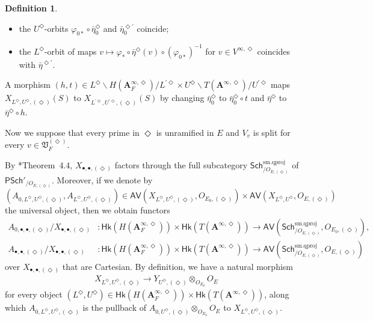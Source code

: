 \documentclass[12pt]{amsart}
\numberwithin{equation}{section}
\theoremstyle{plain}
\theoremstyle{definition}
\newtheorem{definition}[proposition]{Definition}
\theoremstyle{remark}
\renewcommand{\b}[1]{\mathbf{#1}}
\newcommand{\f}[1]{\mathfrak{#1}}
\renewcommand{\r}[1]{\mathrm{#1}}
\renewcommand{\sf}[1]{\mathsf{#1}}
\renewcommand{\(}{\left(}
\renewcommand{\)}{\right)}
\newcommand{\bA}{\b A}
\newcommand{\fV}{\f V}
\newcommand{\sfP}{\sf P}
\newcommand{\smq}{\r{sm.qproj}}
\newcommand{\Sch}{\sf{Sch}}
\newcommand{\AV}{\sf{AV}}
\newcommand{\Hk}{\sf{Hk}}
\begin{document}
\begin{definition}
\begin{itemize}
  \item the $U^\Diamond$-orbits $\varphi_{0*}\circ\bar\eta_0^\Diamond$ and $\bar\eta_0^{\Diamond\prime}$ coincide;

  \item the $L^\Diamond$-orbit of maps $v\mapsto\varphi_*\circ\bar\eta^\Diamond(v)\circ(\varphi_{0*})^{-1}$ for $v\in V^{\infty,\Diamond}$ coincides with $\bar\eta^{\Diamond\prime}$.
\end{itemize}
A morphism $(h,t)\in L^\Diamond\backslash H(\bA_F^{\infty,\Diamond})/L^{\prime\Diamond}\times U^\Diamond\backslash T(\bA^{\infty,\Diamond})/U^{\prime\Diamond}$ maps $X_{L^\Diamond,U^\Diamond,(\Diamond)}(S)$ to $X_{L^{\prime\Diamond},U^{\prime\Diamond},(\Diamond)}(S)$ by changing $\bar\eta_0^\Diamond$ to $\bar\eta_0^\Diamond\circ t$ and $\bar\eta^\Diamond$ to $\bar\eta^\Diamond\circ h$.
\end{definition}


Now we suppose that every prime in $\Diamond$ is unramified in $E$ and $V_v$ is split for every $v\in\fV_F^{(\Diamond)}$.

By \cite{RSZ}*{Theorem~4.4}, $X_{\bullet,\bullet,(\Diamond)}$ factors through the full subcategory $\Sch^\smq_{/O_{E,(\Diamond)}}$ of $\sfP\Sch'_{/O_{E,(\Diamond)}}$. Moreover, if we denote by
\[
(A_{0,L^\Diamond,U^\Diamond,(\Diamond)},A_{L^\Diamond,U^\Diamond,(\Diamond)})\in \AV(X_{L^\Diamond,U^\Diamond,(\Diamond)},O_{E_0,(\Diamond)})\times\AV(X_{L^\Diamond,U^\Diamond},O_{E,(\Diamond)})
\]
the universal object, then we obtain functors
\begin{align*}
A_{0,\bullet,\bullet,(\Diamond)}/X_{\bullet,\bullet,(\Diamond)}&
\colon\Hk(H(\bA_F^{\infty,\Diamond}))\times\Hk(T(\bA^{\infty,\Diamond}))
\to\AV(\Sch^\smq_{/O_{E,(\Diamond)}},O_{E_0,(\Diamond)}),\\
A_{\bullet,\bullet,(\Diamond)}/X_{\bullet,\bullet,(\Diamond)}&
\colon\Hk(H(\bA_F^{\infty,\Diamond}))\times\Hk(T(\bA^{\infty,\Diamond}))
\to\AV(\Sch^\smq_{/O_{E,(\Diamond)}},O_{E,(\Diamond)})
\end{align*}
over $X_{\bullet,\bullet,(\Diamond)}$ that are Cartesian. By definition, we have a natural morphism
\begin{align*}
X_{L^\Diamond,U^\Diamond,(\Diamond)}\to Y_{U^\Diamond,(\Diamond)}\otimes_{O_{E_0}}O_E
\end{align*}
for every object $(L^\Diamond,U^\Diamond)\in\Hk(H(\bA_F^{\infty,\Diamond}))\times\Hk(T(\bA^{\infty,\Diamond}))$, along which $A_{0,L^\Diamond,U^\Diamond,(\Diamond)}$ is the pullback of $A_{0,U^\Diamond,(\Diamond)}\otimes_{O_{E_0}}O_E$ to $X_{L^\Diamond,U^\Diamond,(\Diamond)}$.
\end{document}
